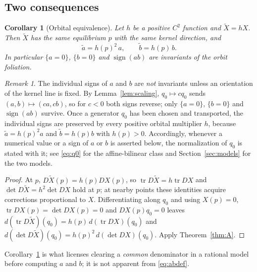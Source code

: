 \documentclass[12pt]{article}
\theoremstyle{plain}
\newtheorem{corollary}[theorem]{Corollary}
\theoremstyle{definition}
\theoremstyle{remark}
\newtheorem{remark}[theorem]{Remark}
\newcommand{\tr}{\operatorname{tr}}
\DeclareMathOperator{\dt}{det}
\begin{document}
	\subsection{Two consequences}
	
	\begin{corollary}[Orbital equivalence]\label{cor:orbital}
		Let $h$ be a positive $C^{2}$ function and $\widetilde X=hX$.  Then
		$\widetilde X$ has the same equilibrium $p$ with the same kernel
		direction, and
		\[
		\widetilde a=h(p)^{2}\,a,\qquad \widetilde b=h(p)\,b .
		\]
		In particular $\{a=0\}$, $\{b=0\}$ and $\operatorname{sign}(ab)$ are
		invariants of the orbit foliation.
	\end{corollary}
	
	\begin{remark}\label{rem:orientation}
		The individual signs of $a$ and $b$ are \emph{not} invariants unless an
		orientation of the kernel line is fixed.  By Lemma~\ref{lem:scaling},
		$q_{0}\mapsto cq_{0}$ sends $(a,b)\mapsto(ca,cb)$, so for $c<0$ both
		signs reverse; only $\{a=0\}$, $\{b=0\}$ and $\operatorname{sign}(ab)$
		survive.  Once a generator $q_{0}$ has been chosen and transported, the
		individual signs are preserved by every positive orbital multiplier
		$h$, because $\widetilde a=h(p)^{2}a$ and $\widetilde b=h(p)b$ with
		$h(p)>0$.  Accordingly, whenever a numerical value or a sign of $a$ or
		$b$ is asserted below, the normalization of $q_{0}$ is stated with it;
		see \eqref{eq:q0} for the affine-bilinear class and
		Section~\ref{sec:models} for the two models.
	\end{remark}
	
	\begin{proof}
		At $p$, $D\widetilde X(p)=h(p)DX(p)$, so $\tr D\widetilde X=h\tr DX$ and
		$\dt D\widetilde X=h^{2}\dt DX$ hold at $p$; at nearby points these
		identities acquire corrections proportional to $X$.  Differentiating
		along $q_{0}$ and using $X(p)=0$, $\tr DX(p)=\dt DX(p)=0$ and
		$DX(p)q_{0}=0$ leaves
		$d(\tr D\widetilde X)(q_{0})=h(p)\,d(\tr DX)(q_{0})$ and
		$d(\dt D\widetilde X)(q_{0})=h(p)^{2}\,d(\dt DX)(q_{0})$.  Apply
		Theorem~\ref{thm:A}.
	\end{proof}
	
	Corollary~\ref{cor:orbital} is what licenses clearing a \emph{common}
	denominator in a rational model before computing $a$ and $b$; it is not
	apparent from \eqref{eq:abdef}.
	
\end{document}

